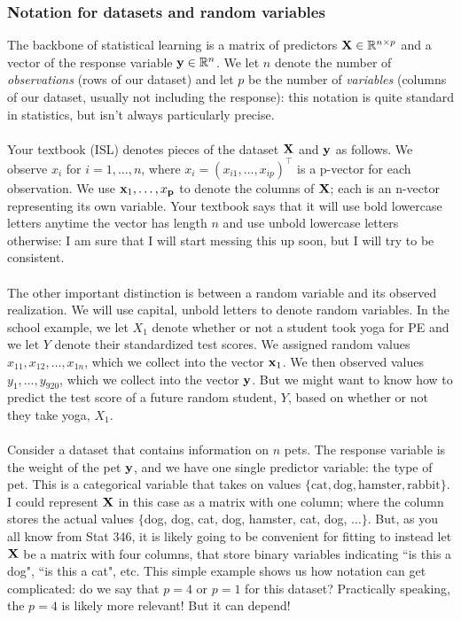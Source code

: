 \documentclass[titlepage,10pt]{scrartcl}
\begin{document}
\subsubsection{Notation for datasets and random variables}

The backbone of statistical learning is a matrix of predictors $\bold{X} \in \mathbb{R}^{n \times p}$ and a vector of the response variable $\bold{y} \in \mathbb{R}^n$. We let $n$ denote the number of \emph{observations} (rows of our dataset) and let $p$ be the number of \emph{variables} (columns of our dataset, usually not including the response): this notation is quite standard in statistics, but isn't always particularly precise. \\
\\
Your textbook (ISL) denotes pieces of the dataset $\bold{X}$ and $\bold{y}$ as follows. We observe $x_i$ for $i = 1,\ldots,n$, where $x_i = (x_{i1}, \ldots, x_{ip})^\top$ is a p-vector for each observation. We use $\bold{x}_1,\ldots,x_\bold{p}$ to denote the columns of $\bold{X}$; each is an n-vector representing its own variable. Your textbook says that it will use bold lowercase letters anytime the vector has length $n$ and use unbold lowercase letters otherwise: I am sure that I will start messing this up soon, but I will try to be consistent. \\
\\
The other important distinction is between a random variable and its observed realization. We will use capital, unbold letters to denote random variables. In the school example, we let $X_1$ denote whether or not a student took yoga for PE and we let $Y$ denote their standardized test scores. We assigned random values $x_{11}, x_{12},\ldots, x_{1n}$, which we collect into the vector $\bold{x}_1$. We then observed values $y_1,\ldots,y_{920}$, which we collect into the vector $\bold{y}$. But we might want to know how to predict the test score of a future random student, $Y$, based on whether or not they take yoga, $X_1$. \\
\\
Consider a dataset that contains information on $n$ pets. The response variable is the weight of the pet $\bold{y}$, and we have one single predictor variable: the type of pet. This is a categorical variable that takes on values $\{ \text{cat}, \text{dog}, \text{hamster}, \text{rabbit} \}$. I could represent $\bold{X}$ in this case as a matrix with one column; where the column stores the actual values $\{$dog, dog, cat, dog, hamster, cat, dog, $\ldots \}$.  But, as you all know from Stat 346, it is likely going to be convenient for fitting to instead let $\bold{X}$ be a matrix with four columns, that store binary variables indicating ``is this a dog", ``is this a cat", etc. This simple example shows us how notation can get complicated: do we say that $p=4$ or $p=1$ for this dataset? Practically speaking, the $p=4$ is likely more relevant! But it can depend!  \\
\end{document}
